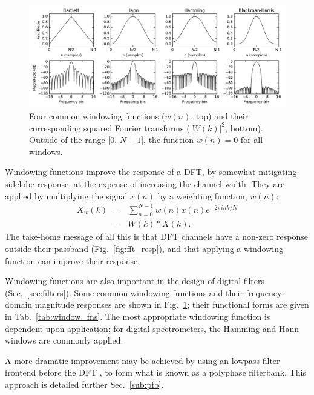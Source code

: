 \documentclass{ws-rv961x669}
\begin{document}
\begin{figure}[t]
 \centering
 \includegraphics[width=\textwidth]{./figures/window_fns}
 \caption{Four common windowing functions ($w(n)$, top) and their corresponding squared Fourier transforms ($|W(k)|^2$, bottom). Outside of the range [0, $N-1$], the function $w(n)=0$ for all windows. \label{fig:window_fns}}
\end{figure}

Windowing functions\citet{SvenGade1987} improve the response of a DFT, by somewhat mitigating sidelobe response, at the expense of increasing the channel width. They are applied by multiplying the signal $x(n)$ by a weighting function, $w(n)$:
\begin{eqnarray}
X_w(k) & = & \sum_{n=0}^{N-1}w(n)x(n)e^{-2\pi ink/N} \\
       & = & W(k)*X(k).
\end{eqnarray}
The take-home message of all this is that DFT channels have a non-zero response outside their passband (Fig.~\ref{fig:fft_resp}), and that applying a windowing function can improve their response. 

Windowing functions are also important in the design of digital filters (Sec.~\ref{sec:filters}). Some common windowing functions and their frequency-domain magnitude responses are shown in Fig.~\ref{fig:window_fns}; their functional forms are given in Tab.~\ref{tab:window_fns}. The most appropriate windowing function is dependent upon application; for digital spectrometers, the Hamming and Hann windows are commonly applied.

A more dramatic improvement may be achieved by using an lowpass filter frontend before the DFT \citep{Bellanger:1976p7898}, to form what is known as a polyphase filterbank. This approach is detailed further Sec.~\ref{sub:pfb}. 

\end{document}
